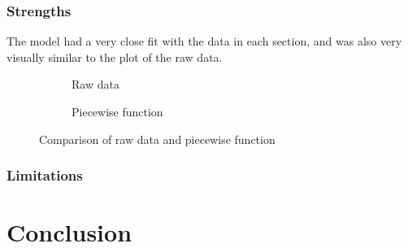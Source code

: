 \documentclass{article}
\theoremstyle{definition}
\begin{document}
        \subsubsection{Strengths}
            The model had a very close fit with the data in each section, and was also very visually similar to the plot of the raw data. 
            \begin{figure}
                \centering
                \begin{subfigure}[b]{0.4\textwidth}
                    \centering
                    \caption{Raw data}
                \end{subfigure}
                \hfill
                \begin{subfigure}[b]{0.4\textwidth}
                    \centering
                    \caption{Piecewise function}
                \end{subfigure}
                \caption{Comparison of raw data and piecewise function}
                \label{figCompareDataAndFunction}
            \end{figure}


        \subsubsection{Limitations}

\section{Conclusion}



\printbibliography
\end{document}

